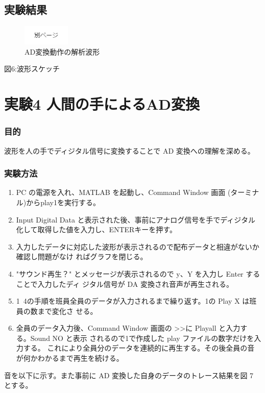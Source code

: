 \documentclass[10pt]{article}
\begin{document}
\subsection{実験結果}
\begin{figure}[H]
		\centering
		\includegraphics[width=0.2\textwidth]{page.png}
		\caption{AD変換動作の解析波形}
\end{figure}
\pagebreak

図6:波形スケッチ
\pagebreak


\section{実験4 人間の手によるAD変換}

\subsubsection{目的}
 波形を人の手でディジタル信号に変換することで AD 変換への理解を深める。 
 
 \subsubsection{実験方法}
 \begin{enumerate}
    \item PC の電源を入れ、MATLAB を起動し、Command Window 画面 (ターミナル)からplay1を実行する。 
    \item Input Digital Data と表示された後、事前にアナログ信号を手でディジタル化して取得した値を入力し、ENTERキーを押す。
    \item 入力したデータに対応した波形が表示されるので配布データと相違がないか確認し問題がなけ ればグラフを閉じる。
    \item "サウンド再生？" とメッセージが表示されるので y、Y を入力し Enter することで入力したディ ジタル信号が DA 変換され音声が再生される。 
    \item 1~4の手順を班員全員のデータが入力されるまで繰り返す。1の Play X は班員の数まで変化さ せる。 
    \item 全員のデータ入力後、Command Window 画面の >>に Playall と入力する。Sound NO と表示 されるので1で作成した play ファイルの数字だけを入力する。 これにより全員分のデータを連続的に再生する。その後全員の音が何かわかるまで再生を続ける。
\end{enumerate}
 音を以下に示す。また事前に AD 変換した自身のデータのトレース結果を図 7 とする。 
\end{document}
